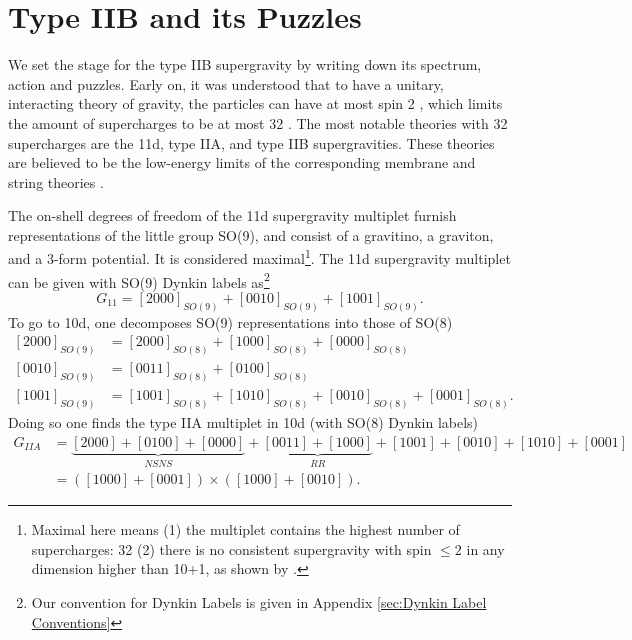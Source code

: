 \section{Type IIB and its Puzzles}
We set the stage for the type IIB supergravity by writing down its spectrum, action and puzzles.
Early on, it was understood that to have a unitary, interacting theory of gravity, the particles can have at most spin 2 \cite{Weinberg:1964ew,Weinberg:1965nx}, which limits the amount of supercharges to be at most 32 \cite{Nahm:1977tg}. 
The most notable theories with 32 supercharges are the 11d, type IIA, and type IIB supergravities. 
These theories are believed to be the low-energy limits of the corresponding membrane and string theories \cite{Green:2012oqa}.


The on-shell degrees of freedom of the 11d supergravity multiplet \cite{Nahm:1977tg,Cremmer1978} furnish representations of the little group SO(9), and consist of a gravitino, a graviton, and a 3-form potential.
It is considered maximal\footnote{
Maximal here means (1) the multiplet contains the highest number of supercharges: 32 (2) there is no consistent supergravity with spin $\le 2$ in any dimension higher than 10+1, as shown by \cite{Nahm:1977tg}.
}. 
The 11d supergravity multiplet can be given with SO(9) Dynkin labels as\footnote{Our convention for Dynkin Labels is given in Appendix \ref{sec:Dynkin Label Conventions}}
\begin{equation}
G_{11} = [2000]_{SO(9)} + [0010]_{SO(9)} + [1001]_{SO(9)}.
\label{11d SUGRA multiplet}
\end{equation}
To go to 10d, one decomposes SO(9) representations into those of SO(8)
\begin{equation}
\begin{aligned}
[2000]_{SO(9)} &= [2000]_{SO(8)} + [1000]_{SO(8)}+[0000]_{SO(8)}\\
[0010]_{SO(9)} &= [0011]_{SO(8)} + [0100]_{SO(8)}\\
[1001]_{SO(9)} &= [1001]_{SO(8)} + [1010]_{SO(8)}+[0010]_{SO(8)}+[0001]_{SO(8)}.
\end{aligned}
\end{equation}
Doing so one finds the type IIA multiplet in 10d (with SO(8) Dynkin labels)
\begin{equation}
\begin{aligned}
G_{IIA} 
&= \underbrace{[2000]+[0100]+[0000]}_{NSNS} + \underbrace{[0011] + [1000]}_{RR} + [1001] + [0010] + [1010] + [0001]\\
&=([1000] + [0001]) \times ([1000] + [0010]).
\end{aligned}
\label{IIA multiplet}
\end{equation}
